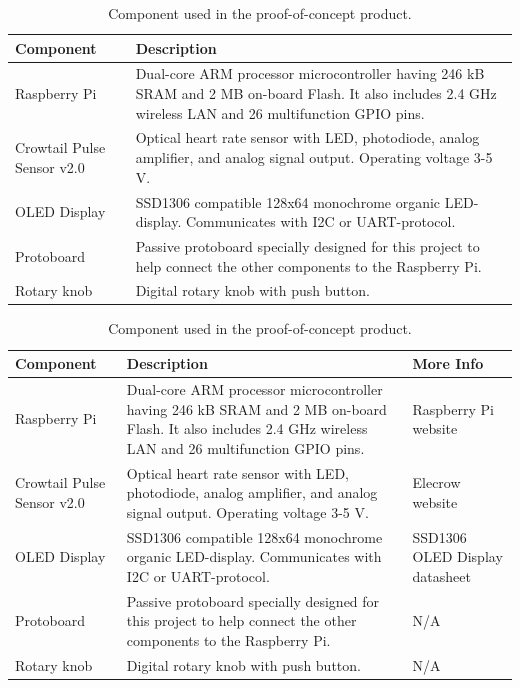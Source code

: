 \documentclass{article}
\begin{document}
\begin{table}[h]
\centering
\caption{Component used in the proof-of-concept product.}
\label{tab:POC_components}
\begin{tabular}{|l|p{5cm}|}
\hline
\textbf{Component} & \textbf{Description} \\ \hline
Raspberry Pi & Dual-core ARM processor microcontroller having 246 kB SRAM and 2 MB on-board Flash. It also includes 2.4 GHz wireless LAN and 26 multifunction GPIO pins.\\ \hline
Crowtail Pulse Sensor v2.0 & Optical heart rate sensor with LED, photodiode, analog amplifier, and analog signal output. Operating voltage 3-5 V. \\ \hline
OLED Display & SSD1306 compatible 128x64 monochrome organic LED-display. Communicates with I2C or UART-protocol. \\ \hline
Protoboard & Passive protoboard specially designed for this project to help connect the other components to the Raspberry Pi. \\ \hline
Rotary knob & Digital rotary knob with push button. \\ \hline
\end{tabular}
\end{table}



\begin{table}[h]
\centering
\caption{Component used in the proof-of-concept product.}
\label{tab:POC_components}
\begin{tabular}{|l|p{5cm}|l|}
\hline
\textbf{Component} & \textbf{Description} & \textbf{More Info} \\ \hline
Raspberry Pi & Dual-core ARM processor microcontroller having 246 kB SRAM and 2 MB on-board Flash. It also includes 2.4 GHz wireless LAN and 26 multifunction GPIO pins. & Raspberry Pi website \\ \hline
Crowtail Pulse Sensor v2.0 & Optical heart rate sensor with LED, photodiode, analog amplifier, and analog signal output. Operating voltage 3-5 V. & Elecrow website \\ \hline
OLED Display & SSD1306 compatible 128x64 monochrome organic LED-display. Communicates with I2C or UART-protocol. & SSD1306 OLED Display datasheet \\ \hline
Protoboard & Passive protoboard specially designed for this project to help connect the other components to the Raspberry Pi. & N/A \\ \hline
Rotary knob & Digital rotary knob with push button. & N/A \\ \hline
\end{tabular}
\end{table}
\end{document}
